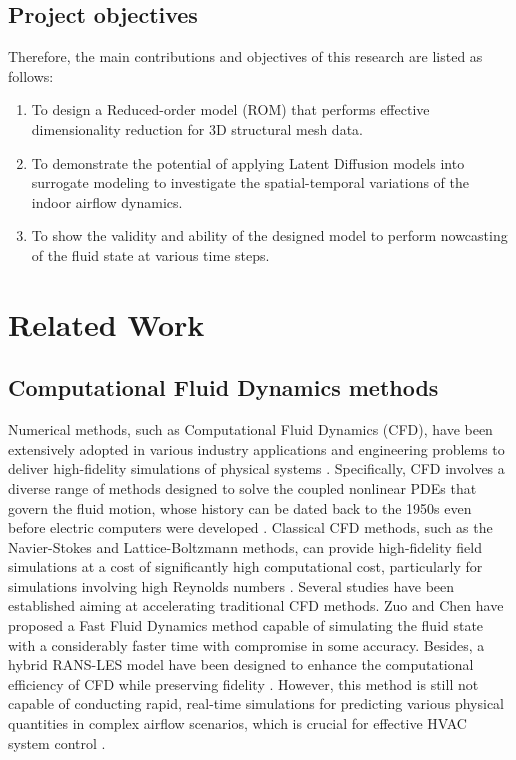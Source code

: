 \documentclass[final-report]{article-template}
\begin{document}
\subsection{Project objectives}
Therefore, the main contributions and objectives of this research are listed as follows:
\begin{enumerate}
    \item To design a Reduced-order model (ROM) that performs effective dimensionality reduction for 3D structural mesh data.  
    \item To demonstrate the potential of applying Latent Diffusion models into surrogate modeling to investigate the spatial-temporal variations of the indoor airflow dynamics.
    \item To show the validity and ability of the designed model to perform nowcasting of the fluid state at various time steps.
\end{enumerate}

\section{Related Work}

\subsection{Computational Fluid Dynamics methods}
Numerical methods, such as Computational Fluid Dynamics (CFD), have been extensively adopted in various industry applications and engineering problems to deliver high-fidelity simulations of physical systems \cite{Lassila2014}. Specifically, CFD involves a diverse range of methods designed to solve the coupled nonlinear PDEs that govern the fluid motion, whose history can be dated back to the 1950s even before electric computers were developed \cite{Bhattacharyya21}. Classical CFD methods, such as the Navier-Stokes and Lattice-Boltzmann methods, can provide high-fidelity field simulations at a cost of significantly high computational cost, particularly for simulations involving high Reynolds numbers \cite{shu2023physics}. Several studies have been established aiming at accelerating traditional CFD methods. Zuo and Chen \cite{zuo2010fast} have proposed a Fast Fluid Dynamics method capable of simulating the fluid state with a considerably faster time with compromise in some accuracy. Besides, a hybrid RANS-LES model have been designed to enhance the computational efficiency of CFD while preserving fidelity \cite{walters2013investigation}. However, this method is still not capable of conducting rapid, real-time simulations for predicting various physical quantities in complex airflow scenarios, which is crucial for effective HVAC system control \cite{shu2023physics}.
\end{document}
